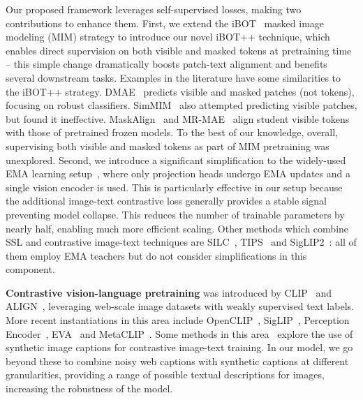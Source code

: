 Our proposed \tipsvtwo framework leverages self-supervised losses, making two contributions to enhance them.
First, we extend the iBOT~\cite{zhou2022ibot} masked image modeling (MIM) strategy to introduce our novel iBOT++ technique, which enables direct supervision on both visible and masked tokens at pretraining time -- this simple change dramatically boosts patch-text alignment and benefits several downstream tasks.
Examples in the literature have some similarities to the iBOT++ strategy.
DMAE~\cite{wu2023dmae} predicts visible and masked patches (not tokens), focusing on robust classifiers.
SimMIM~\cite{xie2022simmim} also attempted predicting visible patches, but found it ineffective.
MaskAlign~\cite{xue2023maskalign} and MR-MAE~\cite{gao2023mrmae} align student visible tokens with those of pretrained frozen models.
To the best of our knowledge, overall, supervising both visible and masked tokens as part of MIM pretraining was unexplored.
Second, we introduce a significant simplification to the widely-used EMA learning setup~\cite{he2020moco}, where only projection heads undergo EMA updates and a single vision encoder is used.
This is particularly effective in our setup because the additional image-text contrastive loss generally provides a stable signal preventing model collapse.
This reduces the number of trainable parameters by nearly half, enabling much more efficient scaling.
Other methods which combine SSL and contrastive image-text techniques are SILC~\cite{naeem2024silc}, TIPS~\cite{tips_paper} and SigLIP2~\cite{tschannen2025siglip2multilingualvisionlanguage}: all of them employ EMA teachers but do not consider simplifications in this component.



\noindent\textbf{Contrastive vision-language pretraining} was introduced by CLIP~\cite{radford2021clip} and ALIGN~\cite{jia2021align}, leveraging web-scale image datasets with weakly supervised text labels.
More recent instantiations in this area include OpenCLIP~\citep{cherti2023reproducible}, SigLIP~\citep{zhai2023siglip}, Perception Encoder~\cite{bolya2025perceptionencoderbestvisual}, EVA~\citep{fang2023eva,fang2024eva02,sun2023evaclip} and MetaCLIP~\cite{xu2024metaclip,chuang2025metaclip2}.
Some methods in this area~\cite{lai2024veclip,fan2023laclip,tips_paper,stone2025visualcomposition} explore the use of synthetic image captions for contrastive image-text training.
In our \tipsvtwo model, we go beyond these to combine noisy web captions with synthetic captions at different granularities, providing a range of possible textual descriptions for images, increasing the robustness of the model.

